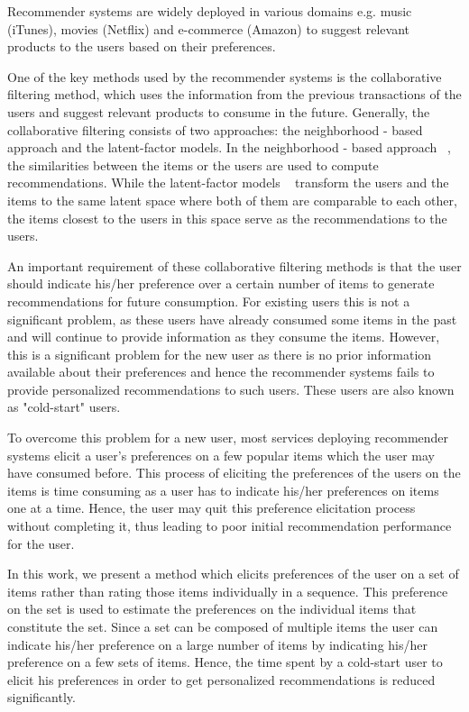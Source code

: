 
Recommender systems are widely deployed in various domains e.g. music (iTunes),
movies (Netflix) and e-commerce (Amazon) to suggest relevant products to the users
based on their preferences. 

One of the key methods used by the recommender systems is the collaborative
filtering method, which uses the information from the previous transactions of 
the users and suggest relevant products to consume in the future. Generally, the collaborative
filtering consists of two approaches: the neighborhood - based approach and the
latent-factor models. In the neighborhood - based approach ~\cite{r30}, the similarities
between the items or the users are used to compute recommendations. While the
latent-factor models ~\cite{r4} transform the users and the items to the same
latent space where both of them are comparable to each other, the items closest
to the users in this space serve as the recommendations to the users.


An important requirement of these collaborative filtering methods is that the
user should indicate his/her preference over a certain number of items to
generate recommendations for future consumption. For existing users this is
not a significant problem, as these users have already consumed some items in the
past and will continue to provide information as they consume the items. 
However, this is a significant problem for the new user as there is no prior 
information available about their preferences and hence the recommender systems
fails to provide personalized recommendations to such users. These users are also
known as "cold-start" users.

To overcome this problem for a new user, most services deploying recommender 
systems elicit a user's preferences on a few popular items which the user may 
have consumed before. 
This process of eliciting the preferences of the users on the items is time
consuming as a user has to indicate his/her preferences on items one at a time.
Hence, the user may quit this preference elicitation process without completing
it, thus leading to poor initial recommendation performance for the user.

In this work, we present a method which elicits preferences of the user on a set of
items rather than rating those items individually in a sequence. This preference
on the set is used to estimate the preferences on the individual items that
constitute the set. Since a set can be composed of multiple items the  user 
can indicate his/her preference on a large
number of items by indicating his/her preference on a few sets of items.  
Hence, the time spent by a cold-start user to elicit his preferences in order to get
personalized recommendations is reduced significantly.


